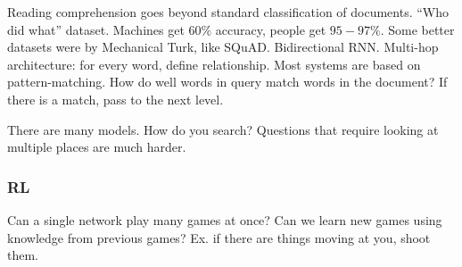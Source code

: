

Reading comprehension goes beyond standard classification of documents. 
``Who did what'' dataset.  Machines get $60\%$ accuracy, people get $95-97\%$. Some better datasets were by Mechanical Turk, like SQuAD. 
Bidirectional RNN. Multi-hop architecture: for every word, define relationship. Most systems are based on pattern-matching. How do well words in query match words in the document? If there is a match, pass to the next level.

There are many models. How do you search?
Questions that require looking at multiple places are much harder.

\subsubsection{RL}

Can a single network play many games at once? Can we learn new games using knowledge from previous games?
Ex. if there are things moving at you, shoot them.

